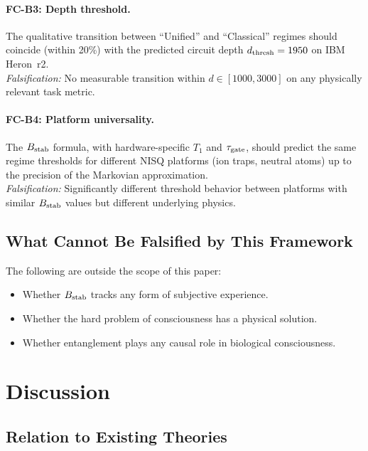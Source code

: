 \documentclass[12pt,letterpaper]{article}
\theoremstyle{definition}
\theoremstyle{remark}
\newcommand{\Bstab}{B_{\rm stab}}
\newcommand{\taugate}{\tau_{\rm gate}}
\begin{document}
\paragraph{FC-B3: Depth threshold.}
The qualitative transition between ``Unified'' and ``Classical'' regimes should
coincide (within 20\%) with the predicted circuit depth $d_{\rm thresh} = 1950$ on
IBM Heron~r2.\\
\textit{Falsification:} No measurable transition within $d\in[1000,3000]$ on any
physically relevant task metric.

\paragraph{FC-B4: Platform universality.}
The $\Bstab$ formula, with hardware-specific $T_1$ and $\taugate$, should predict the
same regime thresholds for different NISQ platforms (ion traps, neutral atoms) up to
the precision of the Markovian approximation.\\
\textit{Falsification:} Significantly different threshold behavior between platforms
with similar $\Bstab$ values but different underlying physics.

\subsection{What Cannot Be Falsified by This Framework}

The following are outside the scope of this paper:
\begin{itemize}[noitemsep]
\item Whether $\Bstab$ tracks any form of subjective experience.
\item Whether the hard problem of consciousness has a physical solution.
\item Whether entanglement plays any causal role in biological consciousness.
\end{itemize}

\section{Discussion}
\label{sec:discussion}

\subsection{Relation to Existing Theories}
\end{document}
